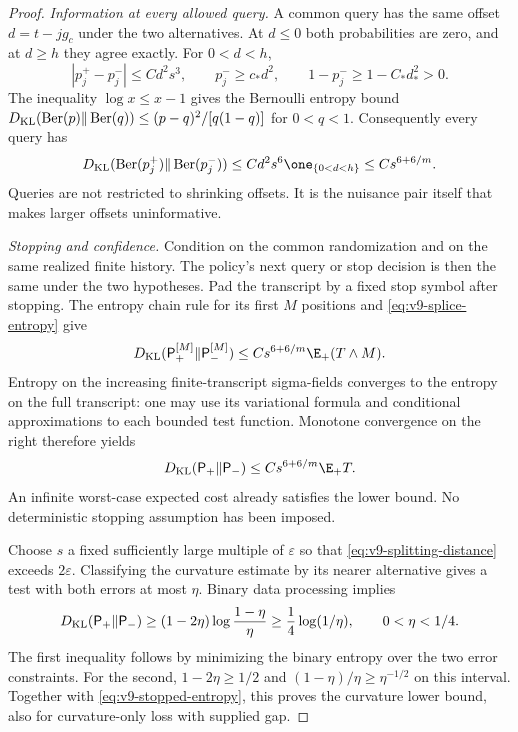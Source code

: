 \begin{proof}
\emph{Information at every allowed query.}
A common query has the same offset $d=t-jg_c$ under the two
alternatives. At $d\le0$ both probabilities are zero, and at
$d\ge h$ they agree exactly. For $0<d<h$,
\[
 |p_j^+-p_j^-|\le C d^2s^3,\qquad
 p_j^-\ge c_*d^2,\qquad 1-p_j^-\ge1-C_*d_*^2>0.
\]
The inequality $\log x\le x-1$ gives the Bernoulli entropy bound
$D_{\rm KL}(\operatorname{Ber}(p)\Vert\operatorname{Ber}(q))
\le(p-q)^2/[q(1-q)]$ for $0<q<1$. Consequently every query has
\begin{equation}\label{eq:v9-splice-entropy}
 D_{\rm KL}(\operatorname{Ber}(p_j^+)
                    \Vert\operatorname{Ber}(p_j^-))
       \le C d^2s^6\one_{\{0<d<h\}}
       \le C s^{6+6/m}.
\end{equation}
Queries are not restricted to shrinking offsets. It is the nuisance
pair itself that makes larger offsets uninformative.

\emph{Stopping and confidence.}
Condition on the common randomization and on the same realized finite
history. The policy's next query or stop decision is then the same
under the two hypotheses. Pad the transcript by a fixed stop symbol
after stopping. The entropy chain rule for its first $M$ positions
and \eqref{eq:v9-splice-entropy} give
\[
 D_{\rm KL}(\mathsf P_+^{[M]}\Vert\mathsf P_-^{[M]})
             \le Cs^{6+6/m}\E_+(T\wedge M).
\]
Entropy on the increasing finite-transcript sigma-fields converges
to the entropy on the full transcript: one may use its variational
formula and conditional approximations to each bounded test
function. Monotone convergence on the right therefore yields
\begin{equation}\label{eq:v9-stopped-entropy}
 D_{\rm KL}(\mathsf P_+\Vert\mathsf P_-)
                              \le Cs^{6+6/m}\E_+T.
\end{equation}
An infinite worst-case expected cost already satisfies the lower
bound. No deterministic stopping assumption has been imposed.

Choose $s$ a fixed sufficiently large multiple of $\varepsilon$
so that \eqref{eq:v9-splitting-distance} exceeds $2\varepsilon$.
Classifying the curvature estimate by its nearer alternative gives a
test with both errors at most $\eta$. Binary data processing implies
\begin{equation}\label{eq:v9-confidence-entropy}
 D_{\rm KL}(\mathsf P_+\Vert\mathsf P_-)
 \ge(1-2\eta)\log\frac{1-\eta}{\eta}
 \ge\frac14\log(1/\eta),\qquad 0<\eta<1/4.
\end{equation}
The first inequality follows by minimizing the binary entropy over
the two error constraints. For the second, $1-2\eta\ge1/2$ and
$(1-\eta)/\eta\ge\eta^{-1/2}$ on this interval.
Together with \eqref{eq:v9-stopped-entropy}, this proves the
curvature lower bound, also for curvature-only loss with supplied gap.


\end{proof}
